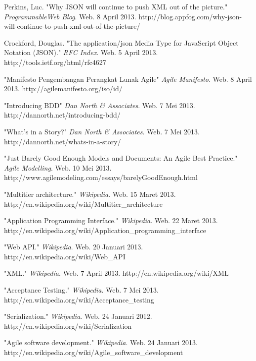 \documentclass{llncs}
\begin{document}
\begin{thebibliography}{1}
Perkins, Luc. "Why JSON will continue to push XML out of the picture." \emph{ProgrammableWeb Blog}. Web. 8 April 2013. http://blog.appfog.com/why-json-will-continue-to-push-xml-out-of-the-picture/

Crockford, Douglas. "The application/json Media Type for JavaScript Object Notation (JSON)." \emph{RFC Index}. Web. 5 April 2013. http://tools.ietf.org/html/rfc4627
  
  "Manifesto Pengembangan Perangkat Lunak Agile" \emph{Agile Manifesto}. Web. 8 April 2013. http://agilemanifesto.org/iso/id/
  
  "Introducing BDD" \emph{Dan North \& Associates}. Web. 7 Mei 2013. http://dannorth.net/introducing-bdd/
  
  "What's in a Story?" \emph{Dan North \& Associates}. Web. 7 Mei 2013. http://dannorth.net/whats-in-a-story/
  
  "Just Barely Good Enough Models and Documents: An Agile Best Practice." \emph{Agile Modelling}. Web. 10 Mei 2013. http://www.agilemodeling.com/essays/barelyGoodEnough.html
  
  "Multitier architecture." \emph{Wikipedia}. Web. 15 Maret 2013. http://en.wikipedia.org/wiki/Multitier\_architecture
  
  "Application Programming Interface." \emph{Wikipedia}. Web. 22 Maret 2013. http://en.wikipedia.org/wiki/Application\_programming\_interface
    
  "Web API." \emph{Wikipedia}. Web. 20 Januari 2013. http://en.wikipedia.org/wiki/Web\_API
  
  "XML." \emph{Wikipedia}. Web. 7 April 2013. http://en.wikipedia.org/wiki/XML
  
  "Acceptance Testing." \emph{Wikipedia}. Web. 7 Mei 2013. http://en.wikipedia.org/wiki/Acceptance\_testing

  "Serialization." \emph{Wikipedia}. Web. 24 Januari 2012. http://en.wikipedia.org/wiki/Serialization

  "Agile software development." \emph{Wikipedia}. Web. 24 Januari 2013. http://en.wikipedia.org/wiki/Agile\_software\_development
\end{thebibliography}
\end{document}
